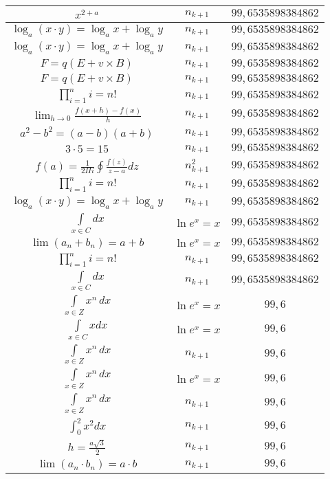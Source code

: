\documentclass{article}
\begin{document}
\begin{flushleft}
\begin{longtable}{|c|c|c|}
$x^{2+a}$ & $n_{k+1}$ & $99,6535898384862$ \\ \hline 
$\log_{a}(x\cdot y)=\log_{a}x+\log_{a}y$ & $n_{k+1}$ & $99,6535898384862$ \\ \hline 
$\log_{a}(x\cdot y)=\log_{a}x+\log_{a}y$ & $n_{k+1}$ & $99,6535898384862$ \\ \hline 
$F=q\left(E+v\times B\right)$ & $n_{k+1}$ & $99,6535898384862$ \\ \hline 
$F=q\left(E+v\times B\right)$ & $n_{k+1}$ & $99,6535898384862$ \\ \hline 
$\prod_{i=1}^ni=n!$ & $n_{k+1}$ & $99,6535898384862$ \\ \hline 
$\lim_{h\to0}\frac{f(x+h)-f(x)}{h}$ & $n_{k+1}$ & $99,6535898384862$ \\ \hline 
$a^2-b^2=(a-b)(a+b)$ & $n_{k+1}$ & $99,6535898384862$ \\ \hline 
$3\cdot 5=15$ & $n_{k+1}$ & $99,6535898384862$ \\ \hline 
$f\left(a\right)=\frac{1}{2\Pi i}\oint\frac{f\left(z\right)}{z-a}dz$ & $n_{k+1}^2$ & $99,6535898384862$ \\ \hline 
$\prod_{i=1}^ni=n!$ & $n_{k+1}$ & $99,6535898384862$ \\ \hline 
$\log_{a}(x\cdot y)=\log_{a}x+\log_{a}y$ & $n_{k+1}$ & $99,6535898384862$ \\ \hline 
$\int \limits_{x\in C}dx$ & $\ln e^x=x$ & $99,6535898384862$ \\ \hline 
$\lim\left(a_n+b_n\right)=a+b$ & $\ln e^x=x$ & $99,6535898384862$ \\ \hline 
$\prod_{i=1}^ni=n!$ & $n_{k+1}$ & $99,6535898384862$ \\ \hline 
$\int \limits_{x\in C}dx$ & $n_{k+1}$ & $99,6535898384862$ \\ \hline 
$\int \limits_{x\in Z}\!x^{n}\,dx$ & $\ln e^x=x$ & $99,6$ \\ \hline 
$\int \limits_{x\in C}xdx$ & $\ln e^x=x$ & $99,6$ \\ \hline 
$\int \limits_{x\in Z}\!x^{n}\,dx$ & $n_{k+1}$ & $99,6$ \\ \hline 
$\int \limits_{x\in Z}\!x^{n}\,dx$ & $\ln e^x=x$ & $99,6$ \\ \hline 
$\int \limits_{x\in Z}\!x^{n}\,dx$ & $n_{k+1}$ & $99,6$ \\ \hline 
$\int _0^2x^2dx$ & $n_{k+1}$ & $99,6$ \\ \hline 
$h=\frac{a\sqrt{3}}{2}$ & $n_{k+1}$ & $99,6$ \\ \hline 
$\lim\left(a_n\cdot b_n\right)=a\cdot b$ & $n_{k+1}$ & $99,6$ \\ \hline 

\end{longtable}
\end{flushleft}
\end{document}
